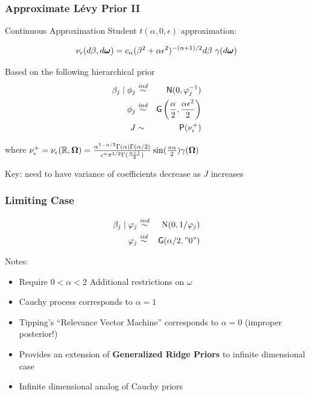 \documentclass[]{beamer}\usepackage[]{graphicx}\usepackage[]{color}
\newcommand{\bs}[2]{\begin{frame} \frametitle{#1}
{#2}
\end{frame} }
\begin{document}
\bs{Approximate L\'evy Prior II} {
Continuous Approximation Student $t(\alpha, 0, \epsilon)$ approximation:

$$\nu_\epsilon(d\beta, d \bm \omega) = c_\alpha (\beta^2 + \alpha
\epsilon^2)^{-(\alpha + 1)/2} d\beta \ \gamma(d \bm \omega) $$

\pause

Based on the following hierarchical prior
\begin{eqnarray*}
  \beta_j \mid \phi_j & \mathrel{\mathop{\sim}\limits^{\mathit{ind}}} & \textsf{N}(0,  \varphi_j^{-1}) \\
  \phi_j    & \mathrel{\mathop{\sim}\limits^{\mathit{ind}}} & \mbox{\sf G}\left(\frac{\alpha}{2}, \frac{\alpha \epsilon^2}{2}\right) \\
   J & \sim & \mbox{\sf P}(\nu^+_\epsilon)
\end{eqnarray*}

where $\nu^+_\epsilon = \nu_\epsilon(\mathbb{R}, \bm \Omega) = \frac{\alpha ^{1
    - \alpha/2} \Gamma(\alpha)\Gamma(\alpha/2)}{\epsilon^\alpha
  \pi^{1/2} \Gamma(\frac{\alpha +1}{2})} \sin(\frac{\pi \alpha} {2}) \gamma(\bm \Omega)$

Key:  need to have variance of coefficients decrease as $J$ increases
}

\bs{Limiting Case} {
  \begin{eqnarray*}
    \beta_j   \mid  \varphi_j & \mathrel{\mathop{\sim}\limits^{\mathit{ind}}} &\mbox{\rm N}(0, 1/\varphi_j) \\
      \varphi_j & \mathrel{\mathop{\sim}\limits^{\mathit{iid}}} & \mbox{\sf G}(\alpha/2, "0")
  \end{eqnarray*}
\pause

Notes:
  \begin{itemize}
\item Require $0 < \alpha < 2$  Additional restrictions  on $\omega$  \pause
\item  Cauchy process corresponds to $\alpha = 1$ \pause
\item  Tipping's ``Relevance Vector Machine'' corresponds to $\alpha =
  0$  (improper posterior!) \pause
\item Provides an extension of {\bf{Generalized Ridge Priors}}
      to infinite dimensional case \pause
\item Infinite dimensional analog of Cauchy priors
 \end{itemize}
}
\end{document}
